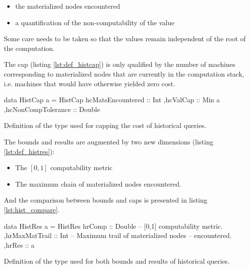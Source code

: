 \begin{itemize}
\item the materialized nodes encountered
\item a quantification of the non-computability of the value
\end{itemize}

Some care needs to be taken so that the values remain independent of
the root of the computation.

The cap (listing \ref{lst:def_histcap}) is only qualified by the number of
machines corresponding to materialized nodes that are currently in the
computation stack, i.e. machines that would have otherwise yielded
zero cost.

\begin{code}
\begin{haskellcode}
data HistCap a =
  HistCap
  { hcMatsEncountered :: Int
   ,hcValCap :: Min a
   ,hcNonCompTolerance :: Double
  }
\end{haskellcode}
  \caption{\label{lst:def_histcap}Definition of the type used for
    capping the cost of historical queries.}
\end{code}

The bounds and results are augmented by two new dimensions (listing
\ref{lst:def_histres}):

\begin{itemize}
\item The \([0,1]\) computability metric
\item The maximum chain of materialized nodes encountered.
\end{itemize}

And the comparison between bounds and caps is presented in listing
\ref{lst:hist_compare}.

\begin{code}
\begin{haskellcode}
data HistRes a =
  HistRes
  { hrComp :: Double  -- [0,1] computability metric.
   ,hrMaxMatTrail :: Int -- Maximum trail of materialized nodes
                         -- encountered.
   ,hrRes :: a
  }
\end{haskellcode}
  \caption{\label{lst:def_histres}Definition of the type used for both
    bounds and results of historical queries.}
\end{code}


